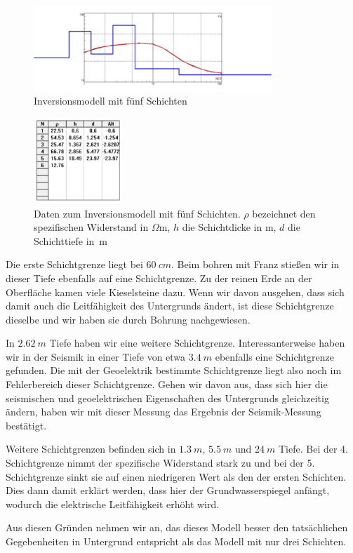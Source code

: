 \begin{figure}[ht]
\centering
\includegraphics[width=0.8\textwidth]{fig/Schlumberger_5Schichten.pdf}
\caption{Inversionsmodell mit fünf Schichten}
\label{abb:Schlum2}
\end{figure}
\begin{figure}[ht]
\centering
\includegraphics[width=0.3\textwidth]{fig/schlumbergerTabelle2.pdf}
\caption[Daten zum Inversionsmodell mit fünf Schichten]{Daten zum Inversionsmodell mit fünf Schichten. $\rho$ bezeichnet den spezifischen Widerstand in $\Omega$m, $h$ die Schichtdicke in m, $d$ die Schichttiefe in~m}
\label{abb:SchlumTab2}
\end{figure}

Die erste Schichtgrenze liegt bei $\SI{60}{cm}$. Beim bohren mit Franz stießen wir in dieser Tiefe ebenfalls auf eine Schichtgrenze. Zu der reinen Erde an der Oberfläche kamen viele Kieselsteine dazu. Wenn wir davon ausgehen, dass sich damit auch die Leitfähigkeit des Untergrunds ändert, ist diese Schichtgrenze dieselbe und wir haben sie durch Bohrung nachgewiesen.

In $\SI{2,62}{m}$ Tiefe haben wir eine weitere Schichtgrenze. Interessanterweise haben wir in der Seismik in einer Tiefe von etwa $\SI{3,4}{m}$ ebenfalls eine Schichtgrenze gefunden. Die mit der Geoelektrik bestimmte Schichtgrenze liegt also noch im Fehlerbereich dieser Schichtgrenze. 
Gehen wir davon aus, dass sich hier die seismischen und geoelektrischen Eigenschaften des Untergrunds gleichzeitig ändern, haben wir mit dieser Messung das Ergebnis der Seismik-Messung bestätigt. 

Weitere Schichtgrenzen befinden sich in $\SI{1,3}{m}$, $\SI{5,5}{m}$ und $\SI{24}{m}$ Tiefe. Bei der 4. Schichtgrenze nimmt der spezifische Widerstand stark zu und bei der 5. Schichtgrenze sinkt sie auf einen niedrigeren Wert als den der ersten Schichten. Dies dann damit erklärt werden, dass hier der Grundwasserspiegel anfängt, wodurch die elektrische Leitfähigkeit erhöht wird.

Aus diesen Gründen nehmen wir an, das dieses Modell besser den tatsächlichen Gegebenheiten in Untergrund entspricht als das Modell mit nur drei Schichten.